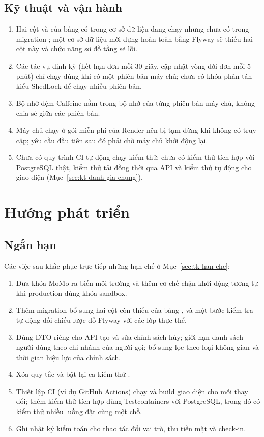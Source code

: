 \subsection{Kỹ thuật và vận hành}
\begin{enumerate}
    \item Hai cột  và  của bảng  có trong cơ sở dữ liệu đang chạy nhưng chưa có trong migration ; một cơ sở dữ liệu mới dựng hoàn toàn bằng Flyway sẽ thiếu hai cột này và chức năng sơ đồ tầng sẽ lỗi.
    \item Các tác vụ định kỳ (hết hạn đơn mỗi 30 giây, cập nhật vòng đời đơn mỗi 5 phút) chỉ chạy đúng khi có một phiên bản máy chủ; chưa có khóa phân tán kiểu ShedLock để chạy nhiều phiên bản.
    \item Bộ nhớ đệm Caffeine nằm trong bộ nhớ của từng phiên bản máy chủ, không chia sẻ giữa các phiên bản.
    \item Máy chủ chạy ở gói miễn phí của Render nên bị tạm dừng khi không có truy cập; yêu cầu đầu tiên sau đó phải chờ máy chủ khởi động lại.
    \item Chưa có quy trình CI tự động chạy kiểm thử; chưa có kiểm thử tích hợp với PostgreSQL thật, kiểm thử tải đồng thời qua API và kiểm thử tự động cho giao diện (Mục~\ref{sec:kt-danh-gia-chung}).
\end{enumerate}

\section{Hướng phát triển}
\label{sec:tk-huong-phat-trien}

\subsection{Ngắn hạn}
Các việc sau khắc phục trực tiếp những hạn chế ở Mục~\ref{sec:tk-han-che}:
\begin{enumerate}
    \item Đưa khóa MoMo ra biến môi trường và thêm cơ chế chặn khởi động tương tự  khi production dùng khóa sandbox.
    \item Thêm migration  bổ sung hai cột còn thiếu của bảng , và một bước kiểm tra tự động đối chiếu lược đồ Flyway với các lớp thực thể.
    \item Dùng DTO riêng cho API tạo và sửa chính sách hủy; giới hạn danh sách người dùng theo chi nhánh của người gọi; bổ sung lọc theo loại không gian và thời gian hiệu lực của chính sách.
    \item Xóa quy tắc  và bật lại ca kiểm thử .
    \item Thiết lập CI (ví dụ GitHub Actions) chạy  và build giao diện cho mỗi thay đổi; thêm kiểm thử tích hợp dùng Testcontainers với PostgreSQL, trong đó có kiểm thử nhiều luồng đặt cùng một chỗ.
    \item Ghi nhật ký kiểm toán cho thao tác đổi vai trò, thu tiền mặt và check-in.
\end{enumerate}

